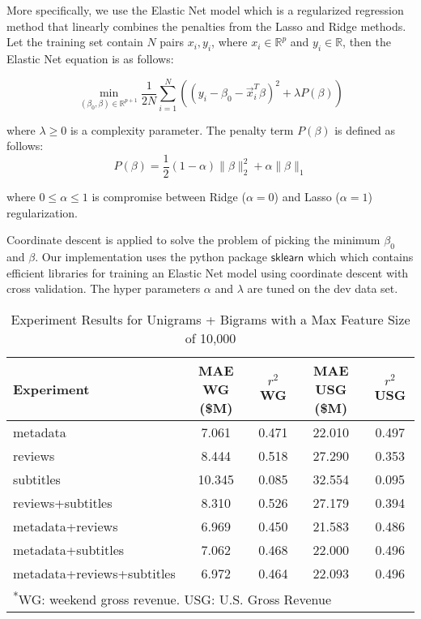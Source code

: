 \documentclass[11pt]{article}
\begin{document}
More specifically, we use the Elastic Net model which is a regularized regression method
that linearly combines the penalties from the Lasso and Ridge methods. Let the training
set contain $N$ pairs $x_i,y_i$, where $x_i \in \mathbb{R}^p$ and $y_i \in \mathbb{R}$,
then the Elastic Net equation is as follows:

$$ \min_{(\beta_0, \beta) \in \mathbb{R}^{p+1}} \frac{1}{2N} \sum_{i=1}^N \left(
(y_i - \beta_0 - \vec{x}_i^T\beta)^2 + \lambda P(\beta)\right)$$

\noindent where $\lambda \geq 0$ is a complexity parameter. The penalty term $P(\beta)$
is defined as follows:
$$P(\beta) = \frac{1}{2}(1 - \alpha) \| \beta \|_2^2 + \alpha \|\beta\|_1$$

\noindent where $0 \leq \alpha \leq 1$ is compromise between Ridge ($\alpha = 0$) and
Lasso ($\alpha = 1$) regularization.

Coordinate descent is applied to solve the problem of picking the minimum $\beta_0$ and
$\beta$. Our implementation uses the python package $\mathsf{sklearn}$ which which
contains efficient libraries for training an Elastic Net model using coordinate descent
with cross validation. The hyper parameters $\alpha$ and $\lambda$ are tuned on the dev
data set.

\begin{table*}[t]
\caption{Experiment Results for Unigrams + Bigrams with a Max Feature Size of 10,000}
\centering
\begin{tabular}{|l c c c c|}
  \hline
  \textbf{Experiment} & \textbf{MAE WG (\$M)} & \textbf{$r^2$ WG} & \textbf{MAE USG (\$M)}
  & \textbf{$r^2$ USG}\\
  \hline
  metadata                    &  7.061 &  0.471  & 22.010  & 0.497\\
  reviews                     &  8.444 &  0.518  & 27.290  & 0.353\\
  subtitles                   & 10.345 &  0.085  & 32.554  & 0.095\\
  reviews+subtitles           &  8.310 &  0.526  & 27.179  & 0.394\\
  metadata+reviews            &  6.969 &  0.450  & 21.583  & 0.486\\
  metadata+subtitles          &  7.062 &  0.468  & 22.000  & 0.496\\
  metadata+reviews+subtitles  &  6.972 &  0.464  & 22.093  & 0.496\\
  \hline
  \multicolumn{5}{l}{\textsuperscript{*}\footnotesize{WG: weekend gross revenue. USG:
  U.S. Gross Revenue}}
\end{tabular}
\end{table*}
\end{document}
